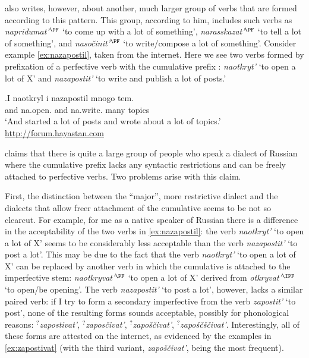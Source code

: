 \citeauthor{Tatevosov:13a} also writes, however, about another, much larger group of verbs that are formed according to this pattern. This group, according to him, includes such verbs as \textit{napridumat'}$^{\PF}$ `to come up with a lot of something', \textit{narasskazat'}$^{\PF}$ `to tell a lot of something', and \textit{naso\v{c}init'}$^{\PF}$ `to write/compose a lot of something'. Consider example \ref{ex:nazapostil}, taken from the internet. Here we see two verbs formed by prefixation of a perfective verb with the cumulative prefix : \textit{naotkryt'} `to open a lot of X' and \textit{nazapostit'} `to write and publish a lot of posts.'
 
\exg.\label{ex:nazapostil}I naotkryl i nazapostil mnogo tem.\\
and na.open. and {na.write.} {many} {topics}\\
\trans `And started a lot of posts and wrote about a lot of topics.'\\\hbox{}\hfill\hbox{\url{http://forum.hayastan.com}}

\citet{Tatevosov:13a} claims that there is quite a large group of people who speak a dialect of Russian where the cumulative prefix  lacks any syntactic restrictions and can be freely attached to perfective verbs. Two problems arise with this claim.

First, the distinction between the ``major'', more restrictive dialect and the dialects that allow freer attachment of the cumulative  seems to be not so clearcut. For example, for me as a native speaker of Russian there is a difference in the acceptability of the two verbs in \ref{ex:nazapostil}: the verb \textit{naotkryt'} `to open a lot of X' seems to be considerably less acceptable than the verb \textit{nazapostit'} `to post a lot'. This may be due to the fact that the verb \textit{naotkryt'} `to open a lot of X' can be replaced by another verb in which the cumulative  is attached to the imperfective stem: \textit{naotkryvat'}$^{\PF}$ `to open a lot of X' derived from \textit{otkryvat'}$^{\IPF}$ `to open/be opening'. The verb \textit{nazapostit'} `to post a lot', however, lacks a similar paired verb: if I try to form a secondary imperfective from the verb \textit{zapostit'} `to post', none of the resulting forms sounds acceptable, possibly for phonological reasons: $^?$\textit{zapostivat'}, $^?$\textit{zapos\v{c}ivat'}, $^?$\textit{zapo\v{s}\v{c}ivat'}, $^?$\textit{zapo\v{s}\v{c}\v{s}\v{c}ivat'}. Interestingly, all of these forms are attested on the internet, as evidenced by the examples in \ref{ex:zapostivat} (with the third variant, \textit{zapo\v{s}\v{c}ivat'}, being the most frequent).

